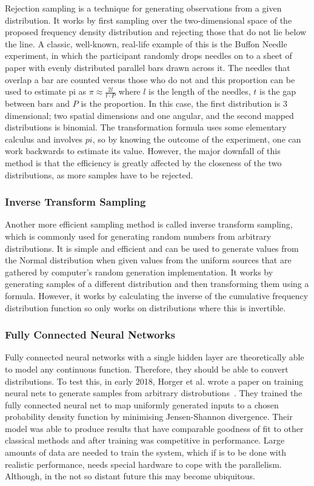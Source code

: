 \documentclass[ %
                    author={Samuel Russell},
                supervisor={Prof. Bogdan Warinschi},
                    degree={MEng},
                     title={Innocuous Ciphertexts},
                  subtitle={The DE-CENSOR Scheme},
                      type={Research},
                      year={2018} ]{dissertation}
\begin{document}
Rejection sampling is a technique for generating observations from a given distribution.
It works by first sampling over the two-dimensional space of the proposed frequency density distribution and rejecting those that do not lie below the line.
A classic, well-known, real-life example of this is the Buffon Needle experiment, in which the participant randomly drops needles on to a sheet of paper with evenly distributed parallel bars drawn across it.
The needles that overlap a bar are counted versus those who do not and this proportion can be used to estimate pi as $\pi \approx \frac{2l}{t \cdot P}$ where $l$ is the length of the needles, $t$ is the gap between bars and $P$ is the proportion.
In this case, the first distribution is 3 dimensional; two spatial dimensions and one angular, and the second mapped distributions is binomial.
The transformation formula uses some elementary calculus and involves $pi$, so by knowing the outcome of the experiment, one can work backwards to estimate its value.
However, the major downfall of this method is that the efficiency is greatly affected by the closeness of the two distributions, as more samples have to be rejected.

\subsubsection{Inverse Transform Sampling}

Another more efficient sampling method is called inverse transform sampling, which is commonly used for generating random numbers from arbitrary distributions.
It is simple and efficient and can be used to generate values from the Normal distribution when given values from the uniform sources that are gathered by computer's random generation implementation.
It works by generating samples of a different distribution and then transforming them using a formula.
However, it works by calculating the inverse of the cumulative frequency distribution function so only works on distributions where this is invertible.

\subsubsection{Fully Connected Neural Networks}

Fully connected neural networks with a single hidden layer are theoretically able to model any continuous function.
Therefore, they should be able to convert distributions.
To test this, in early 2018, Horger et al. wrote a paper on training neural nets to generate samples from arbitrary distrobutions~\cite{deepl}.
They trained the fully connected neural net to map uniformly generated inputs to a chosen probability density function by minimising Jensen-Shannon divergence.
Their model was able to produce results that have comparable goodness of fit to other classical methods and after training was competitive in performance.
Large amounts of data are needed to train the system, which if is to be done with realistic performance, needs special hardware to cope with the parallelism. Although, in the not so distant future this may become ubiquitous.
\end{document}
